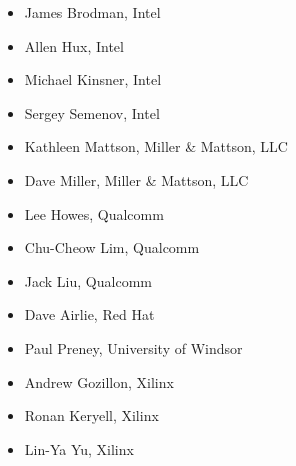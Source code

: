 \begin{multicols}{2}
\begin{itemize}
\item
    James Brodman, Intel
\item
    Allen Hux, Intel
\item
    Michael Kinsner, Intel
\item
    Sergey Semenov, Intel
\item
    Kathleen Mattson, Miller \& Mattson, LLC
\item
    Dave Miller, Miller \& Mattson, LLC
\item
    Lee Howes, Qualcomm
\item
    Chu-Cheow Lim, Qualcomm
\item
    Jack Liu, Qualcomm
\item
    Dave Airlie, Red Hat
\item
    Paul Preney, University of Windsor
\item
    Andrew Gozillon, Xilinx
\item
    Ronan Keryell, Xilinx
\item
    Lin-Ya Yu, Xilinx
\end{itemize}
\end{multicols}

